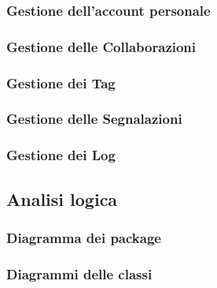 \documentclass{article}
\begin{document}
\subsubsection{Gestione dell'account personale}

\subsubsection{Gestione delle Collaborazioni}

\subsubsection{Gestione dei Tag}

\subsubsection{Gestione delle Segnalazioni}

\subsubsection{Gestione dei Log}


\subsection{Analisi logica}

\subsubsection{Diagramma dei package}

\subsubsection{Diagrammi delle classi}




\end{document}
